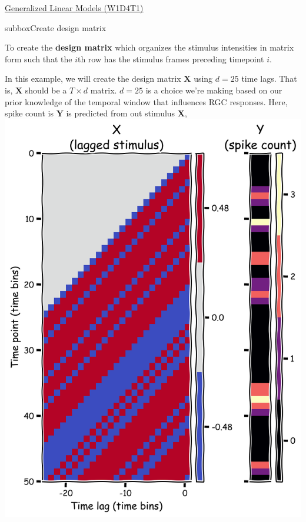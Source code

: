 \let\clearpage\relax
\begin{textbox}{\href{https://compneuro.neuromatch.io/tutorials/W1D4_GeneralizedLinearModels/student/W1D4_Tutorial1.html}{Generalized Linear Models (W1D4T1)} }
\begin{subbox}{subbox}{Create design matrix}
\scriptsize

To create the \textbf{design matrix} which organizes the stimulus intensities in matrix form such that the $i$th row has the stimulus frames preceding timepoint $i$.

In this example, we will create the design matrix $\mathbf{X}$ using $d=25$ time lags. That is, $\mathbf{X}$ should be a $T \times d$ matrix. $d = 25$  is a choice we're making based on our prior knowledge of the temporal window that influences RGC responses. 
Here, spike count is $\mathbf{Y}$ is predicted from out stimulus $\mathbf{X}$,
\centering
\includegraphics[scale=0.11]{Figures/GLM/GLMFigure1.png}
\end{subbox}


\end{textbox}
